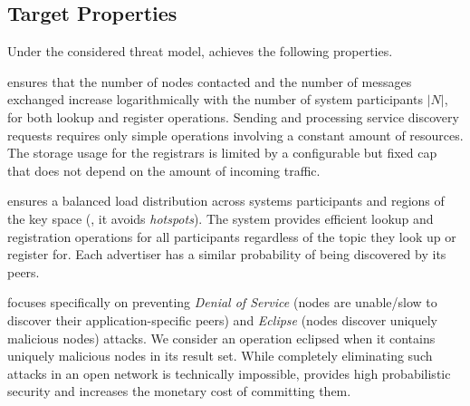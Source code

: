 
\subsection{Target Properties}

Under the considered threat model, \sysname achieves the following properties.

\sysname ensures that the number of nodes contacted and the number of messages exchanged increase logarithmically with the number of system participants $|N|$, for both lookup and register operations. 
Sending and processing service discovery requests requires only simple operations involving a constant amount of resources.
The storage usage for the registrars is limited by a configurable but fixed cap that does not depend on the amount of incoming traffic. 

\sysname ensures a balanced load distribution across systems participants and regions of the key space (\ie, it avoids \emph{hotspots}).
The system provides efficient lookup and registration operations for all participants regardless of the topic they look up or register for.
Each advertiser has a similar probability of being discovered by its peers. 

\sysname focuses specifically on preventing \emph{Denial of Service} (nodes are unable/slow to discover their application-specific peers) and \emph{Eclipse} (nodes discover uniquely malicious nodes) attacks. We consider an operation eclipsed when it contains uniquely malicious nodes in its result set.
While completely eliminating such attacks in an open network is technically impossible, \sysname provides high probabilistic security 
and increases the monetary cost of committing them. 
